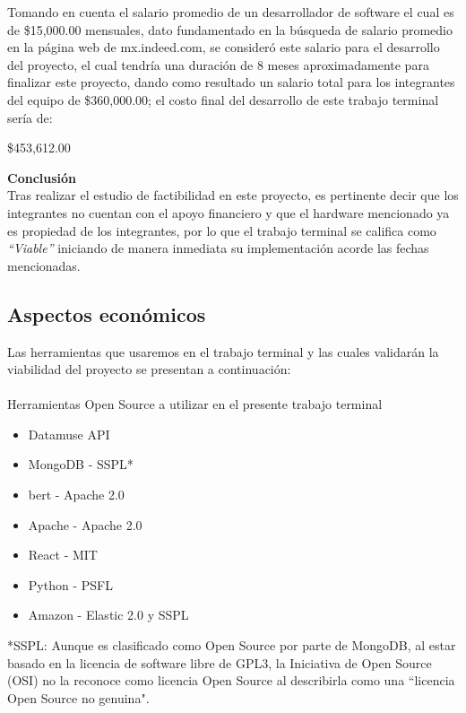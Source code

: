 \documentclass[12pt, a4paper, titlepage]{report}
\begin{document}
    	Tomando en cuenta el salario promedio de un desarrollador de software el cual es de \$15,000.00 mensuales, dato fundamentado en la búsqueda de salario promedio en la página web de mx.indeed.com, se consideró este salario para el desarrollo del proyecto, el cual tendría una duración de 8 meses aproximadamente para finalizar este proyecto, dando como resultado un salario total para los integrantes del equipo de \$360,000.00; el costo final del desarrollo de este trabajo terminal sería de: \\
    	\begin{center}
    		\$453,612.00
    	\end{center}
    	\textbf{Conclusión\\} 
    	Tras realizar el estudio de factibilidad en este proyecto, es pertinente decir que los integrantes no cuentan con el apoyo financiero y que el hardware mencionado ya es propiedad de los integrantes, por lo que el trabajo terminal se califica como \textit{“Viable”} iniciando de manera inmediata su implementación acorde las fechas mencionadas.
    	
    	\subsection{Aspectos económicos}
    	Las herramientas que usaremos en el trabajo terminal y las cuales validarán la viabilidad del proyecto se presentan a continuación:\\\\
    	Herramientas Open Source a utilizar en el presente trabajo terminal
    	
    	\begin{itemize}
    		\item Datamuse API \cite{refDatamuseLicense}
    		\item MongoDB - SSPL* \cite{refMongoDBLicense}
    		\item \acrshort{bert} - Apache 2.0 \cite{refBERTLicense}
    		\item Apache - Apache 2.0 \cite{refApacheLicense}
    		\item React - MIT \cite{refReactLicense}
    		\item Python - PSFL \cite{refPythonLicense}
    		\item Amazon - Elastic 2.0 y SSPL \cite{refAmazonLicense}
    	\end{itemize}
    	
    	*SSPL: Aunque es clasificado como Open Source por parte de MongoDB, al estar basado en la licencia de software libre de GPL3, la Iniciativa de Open Source (OSI) no la reconoce como licencia Open Source al describirla como una  ``licencia Open Source no genuina".\\
    	
\end{document}
